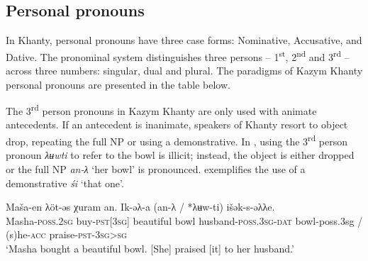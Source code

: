 \documentclass[output=paper]{langscibook}
\begin{document}
\subsection{\textbf{Personal} \textbf{pronouns}}\label{sec:Volkova:2.5}

In Khanty, personal pronouns have three case forms: Nominative, Accusative, and Dative. The pronominal system distinguishes three persons – 1\textsuperscript{st}, 2\textsuperscript{nd} and 3\textsuperscript{rd} – across three numbers: singular, dual and plural. The paradigms of Kazym Khanty personal pronouns are presented in the table below.

\begin{table}
\caption{Personal pronouns}\label{tab:Volkova:1}

\end{table}




The 3\textsuperscript{rd} person pronouns in Kazym Khanty are only used with animate antecedents. If an antecedent is inanimate, speakers of Khanty resort to object drop, repeating the full NP or using a demonstrative. In , using the 3\textsuperscript{rd} person pronoun \textit{λʉwti} to refer to the bowl is illicit; instead, the object is either dropped or the full NP \textit{an-λ} ‘her bowl’ is pronounced.  exemplifies the use of a demonstrative \textit{śi} ‘that one’.

\ea 
\label{ex:Volkova:16}
 \gll Maša-en λöt-əs χuram an. Ik-əλ-a (an-λ / *λʉw-ti) išək-s-əλλe.\\
 Masha\textsc{{}-poss.2sg} buy\textsc{{}-pst[3sg]} beautiful bowl husband\textsc{{}-poss.3sg-dat} bowl-poss.3sg / (s)he\textsc{-acc} praise-\textsc{pst-3sg>sg} \\
 \glt ‘Masha bought a beautiful bowl. [She] praised [it] to her husband.’
\z
\end{document}
